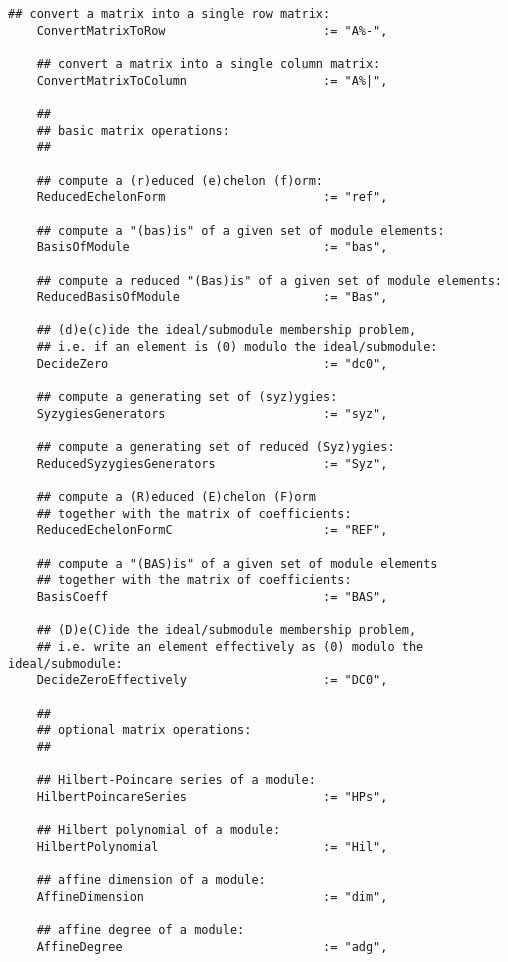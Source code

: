 \documentclass[a4paper,11pt]{report}
\begin{document}
{{{\begin{Verbatim}[fontsize=\small,frame=single,label=Code]
    ## convert a matrix into a single row matrix:
    ConvertMatrixToRow                      := "A%-",
    
    ## convert a matrix into a single column matrix:
    ConvertMatrixToColumn                   := "A%|",
    
    ##
    ## basic matrix operations:
    ##
    
    ## compute a (r)educed (e)chelon (f)orm:
    ReducedEchelonForm                      := "ref",
    
    ## compute a "(bas)is" of a given set of module elements:
    BasisOfModule                           := "bas",
    
    ## compute a reduced "(Bas)is" of a given set of module elements:
    ReducedBasisOfModule                    := "Bas",
    
    ## (d)e(c)ide the ideal/submodule membership problem,
    ## i.e. if an element is (0) modulo the ideal/submodule:
    DecideZero                              := "dc0",
    
    ## compute a generating set of (syz)ygies:
    SyzygiesGenerators                      := "syz",
    
    ## compute a generating set of reduced (Syz)ygies:
    ReducedSyzygiesGenerators               := "Syz",
    
    ## compute a (R)educed (E)chelon (F)orm
    ## together with the matrix of coefficients:
    ReducedEchelonFormC                     := "REF",
    
    ## compute a "(BAS)is" of a given set of module elements
    ## together with the matrix of coefficients:
    BasisCoeff                              := "BAS",
    
    ## (D)e(C)ide the ideal/submodule membership problem,
    ## i.e. write an element effectively as (0) modulo the ideal/submodule:
    DecideZeroEffectively                   := "DC0",
    
    ##
    ## optional matrix operations:
    ##
    
    ## Hilbert-Poincare series of a module:
    HilbertPoincareSeries                   := "HPs",
    
    ## Hilbert polynomial of a module:
    HilbertPolynomial                       := "Hil",
    
    ## affine dimension of a module:
    AffineDimension                         := "dim",
    
    ## affine degree of a module:
    AffineDegree                            := "adg",
    

\end{Verbatim}}}}
\end{document}
